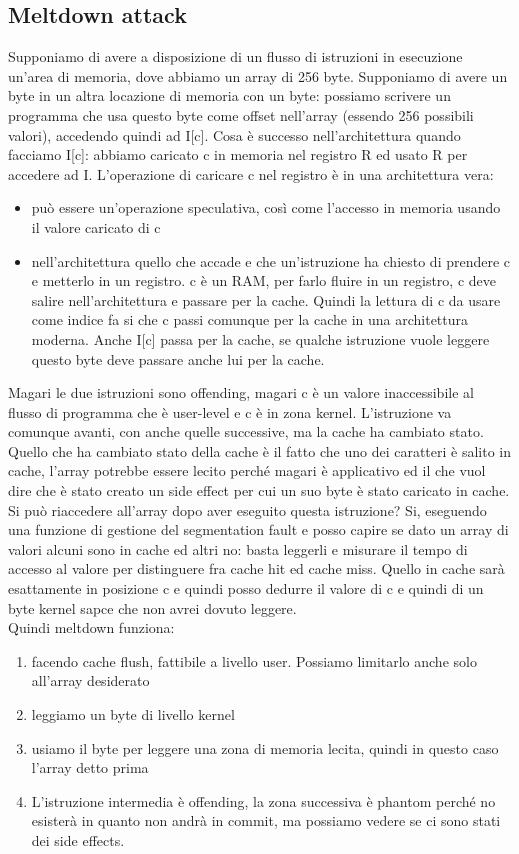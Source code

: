 \documentclass[14pt]{article}
\begin{document}
\subsection{Meltdown attack}
Supponiamo di avere a disposizione di un flusso di istruzioni in esecuzione un'area di memoria, dove abbiamo un array di 256 byte. Supponiamo di avere un byte in un altra locazione di memoria con un byte: possiamo scrivere un programma che usa questo byte come offset nell'array (essendo 256 possibili valori), accedendo quindi ad I[c]. Cosa è successo nell'architettura quando facciamo I[c]: abbiamo caricato c in memoria nel registro R ed usato R per accedere ad I. L'operazione di caricare c nel registro è in una architettura vera:
\begin{itemize}
\item può essere un'operazione speculativa, così come l'accesso in memoria usando il valore caricato di c
\item nell'architettura quello che accade e che un'istruzione ha chiesto di prendere c e metterlo in un registro. c è un RAM, per farlo fluire in un registro, c deve salire nell'architettura e passare per la cache. Quindi la lettura di c da usare come indice fa si che c passi comunque per la cache in una architettura moderna. Anche I[c] passa per la cache, se qualche istruzione vuole leggere questo byte deve passare anche lui per la cache.
\end{itemize}
Magari le due istruzioni sono offending, magari c è un valore inaccessibile al flusso di programma che è user-level e c è in zona kernel. L'istruzione va comunque avanti, con anche quelle successive, ma la cache ha cambiato stato. Quello che ha cambiato stato della cache è il fatto che uno dei caratteri è salito in cache, l'array potrebbe essere lecito perché magari è applicativo ed il che vuol dire che è stato creato un side effect per cui un suo byte è stato caricato in cache. Si può riaccedere all'array dopo aver eseguito questa istruzione? Si, eseguendo una funzione di gestione del segmentation fault e posso capire se dato un array di valori alcuni sono in cache ed altri no: basta leggerli e misurare il tempo di accesso al valore per distinguere fra cache hit ed cache miss. Quello in cache sarà esattamente in posizione c e quindi posso dedurre il valore di c e quindi di un byte kernel sapce che non avrei dovuto leggere.\\ Quindi meltdown funziona:
\begin{enumerate}
\item facendo cache flush, fattibile a livello user. Possiamo limitarlo anche solo all'array desiderato
\item leggiamo un byte di livello kernel
\item usiamo il byte per leggere una zona di memoria lecita, quindi in questo caso l'array detto prima
\item L'istruzione intermedia è offending, la zona successiva è phantom perché no esisterà in quanto non andrà in commit, ma possiamo vedere se ci sono stati dei side effects.
\end{enumerate} 
\end{document}
